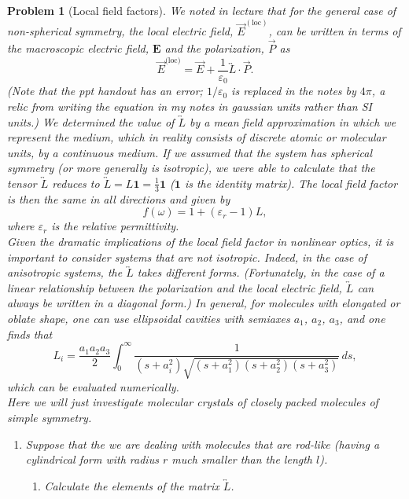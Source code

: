 \documentclass[UTF8,10pt,a4paper]{article}
\theoremstyle{Problem}
\newtheorem{prob}{Problem}
\theoremstyle{Solution}
\begin{document}
\thispagestyle{FirstPageStyle}
\begin{prob}[Local field factors]
    We noted in lecture that for the general case of non-spherical symmetry, the local electric field, $\vec{E}^{(\text{loc})}$, can be written in terms of the macroscopic electric field, $\bm{E}$ and the polarization, $\vec{P}$ as
    \[
        \vec{E}^{\text{(loc)}}=\vec{E}+\frac{1}{\varepsilon_0}\overleftrightarrow{L}\cdot\vec{P}.
    \]
    (Note that the ppt handout has an error; $1/\varepsilon_0$ is replaced in the notes by $4\pi$, a relic from writing the equation in my notes in gaussian units rather than SI units.) We determined the value of $\overleftrightarrow{L}$ by a \textit{mean field} approximation in which we represent the medium, which in reality consists of discrete atomic or molecular units, by a continuous medium. If we assumed that the system has spherical symmetry (or more generally is isotropic), we were able to calculate that the tensor $\overleftrightarrow{L}$ reduces to $\overleftrightarrow{L}=L\bm{1}=\frac{1}{3}\bm{1}$ ($\bm{1}$ is the identity matrix). The local field factor is then the same in all directions and given by
    \[
        f(\omega)=1+(\varepsilon_r-1)L,
    \]
    where $\varepsilon_r$ is the relative permittivity.\\
    Given the dramatic implications of the local field factor in nonlinear optics, it is important to consider systems that are not isotropic. Indeed, in the case of anisotropic systems, the $\overleftrightarrow{L}$ takes different forms. (Fortunately, in the case of a linear relationship between the polarization and the local electric field, $\overleftrightarrow{L}$ can always be written in a diagonal form.) In general, for molecules with elongated or oblate shape, one can use ellipsoidal cavities with semiaxes $a_1$, $a_2$, $a_3$, and one finds that
    \[
        L_i=\frac{a_1a_2a_3}{2}\int_0^{\infty}\frac{1}{(s+a_i^2)\sqrt{(s+a_1^2)(s+a_2^2)(s+a_3^2)}}\,ds,
    \]
    which can be evaluated numerically.\\
    Here we will just investigate molecular crystals of closely packed molecules of simple symmetry.
    \begin{enumerate}
        \item[(a)] Suppose that the we are dealing with molecules that are rod-like (having a cylindrical form with radius $r$ much smaller than the length $l$).
        \begin{enumerate}
            \item[i.] Calculate the elements of the matrix $\overleftrightarrow{L}$.

\end{enumerate}
\end{enumerate}
\end{prob}
\end{document}
